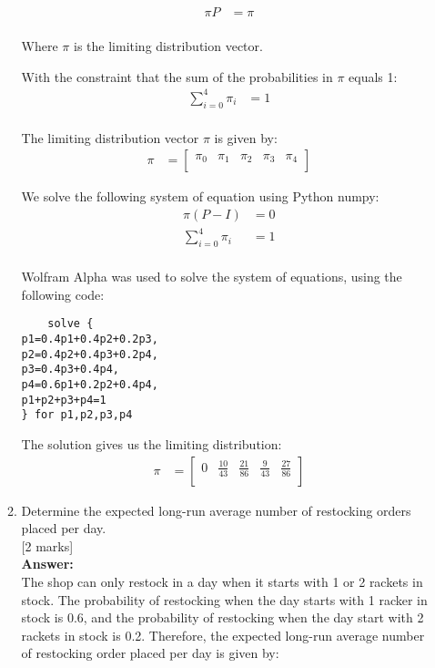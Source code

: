 \documentclass[12pt]{article}
\begin{document}
\begin{enumerate}
\begin{enumerate}
\begin{align*}
\pi P &= \pi \\
\end{align*}

Where $\pi$ is the limiting distribution vector.

With the constraint that the sum of the probabilities in $\pi$ equals 1:
\begin{align*}
\sum_{i=0}^{4} \pi_i &= 1 \\
\end{align*}


The limiting distribution vector $\pi$ is given by:
\begin{align*}
\pi &= \begin{bmatrix}
\pi_0 & \pi_1 & \pi_2 & \pi_3 & \pi_4 \\
\end{bmatrix}
\end{align*}

We solve the following system of equation using Python numpy:
\begin{align*}
	\pi(P - I) &= 0 \\
	\sum_{i=0}^{4} \pi_i &= 1 \\
\end{align*}

Wolfram Alpha was used to solve the system of equations, using the following code:

\begin{verbatim}
	solve {
p1=0.4p1+0.4p2+0.2p3,
p2=0.4p2+0.4p3+0.2p4,
p3=0.4p3+0.4p4,
p4=0.6p1+0.2p2+0.4p4,
p1+p2+p3+p4=1
} for p1,p2,p3,p4
\end{verbatim}

The solution gives us the limiting distribution: 
\begin{align*}
\pi &= 
\begin{bmatrix}
0 & \frac{10}{43} & \frac{21}{86} & \frac{9}{43} & \frac{27}{86} \\
\end{bmatrix}
\end{align*}

\item Determine the expected long-run average number of restocking orders placed per day. 
			\\\phantom{1}\hfill [2 marks]
%
\\
\textbf{Answer:}
\\
The shop can only restock in a day when it starts with 1 or 2 rackets in stock. The probability of restocking when the day starts with 1 racker in stock is 0.6, and the probability of restocking when the day start with 2 rackets in stock is 0.2. Therefore, the expected long-run average number of restocking order placed per day is given by:


\end{enumerate}
\end{enumerate}
\end{document}
